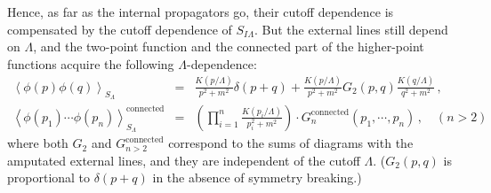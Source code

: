 \documentclass[aps,prd,preprint,groupedaddress,preprintnumbers,longbibliography]{revtex4-1}
\newcommand{\SIL}{S_{I\Lambda}}
\newcommand{\vev}[1]{\left\langle #1 \right\rangle}
\begin{document}
Hence, as far as the internal propagators go, their cutoff dependence is
compensated by the cutoff dependence of $\SIL$.  But the external
lines still depend on $\Lambda$, and the two-point function and the
connected part of the higher-point functions acquire the following
$\Lambda$-dependence:
\begin{subequations}
\begin{eqnarray}
\vev{\phi (p) \phi (q)}_{S_\Lambda} &=& 
  \frac{K(p/\Lambda)}{p^2+m^2} \delta (p+q) +
  \frac{K(p/\Lambda)}{p^2+m^2} G_2 (p,q) 
  \frac{K(q/\Lambda)}{q^2+m^2} \,,\\
\vev{\phi (p_1) \cdots \phi (p_n)}_{S_\Lambda}^{\mathrm{connected}}
&=& \left(\prod_{i=1}^n \frac{K(p_i/\Lambda)}{p_i^2+m^2} \right) \cdot
G^{\mathrm{connected}} _n (p_1, \cdots, p_n) \,,\quad (n > 2)
\end{eqnarray}
\end{subequations}
where both $G_2$ and $G^{\mathrm{connected}}_{n > 2}$ correspond to
the sums of diagrams with the amputated external lines, and they are
independent of the cutoff $\Lambda$.  ($G_2 (p,q)$ is
proportional to $\delta (p+q)$ in the absence of symmetry breaking.)
\end{document}
